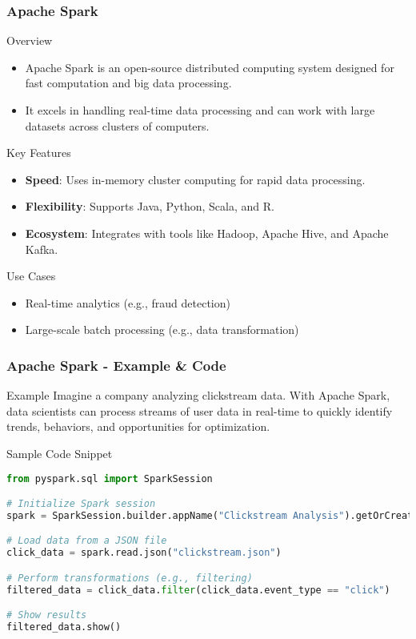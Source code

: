 \documentclass[aspectratio=169]{beamer}
\begin{document}
\begin{frame}
  \frametitle{Apache Spark}
  \begin{block}{Overview}
  \begin{itemize}
    \item Apache Spark is an open-source distributed computing system designed for fast computation and big data processing.
    \item It excels in handling real-time data processing and can work with large datasets across clusters of computers.
  \end{itemize}
  \end{block}

  \begin{block}{Key Features}
  \begin{itemize}
    \item \textbf{Speed}: Uses in-memory cluster computing for rapid data processing.
    \item \textbf{Flexibility}: Supports Java, Python, Scala, and R.
    \item \textbf{Ecosystem}: Integrates with tools like Hadoop, Apache Hive, and Apache Kafka.
  \end{itemize}
  \end{block}

  \begin{block}{Use Cases}
  \begin{itemize}
    \item Real-time analytics (e.g., fraud detection)
    \item Large-scale batch processing (e.g., data transformation)
  \end{itemize}
  \end{block}
\end{frame}

\begin{frame}[fragile]
  \frametitle{Apache Spark - Example & Code}
  \begin{block}{Example}
  Imagine a company analyzing clickstream data. With Apache Spark, data scientists can process streams of user data in real-time to quickly identify trends, behaviors, and opportunities for optimization.
  \end{block}

  \begin{block}{Sample Code Snippet}
  \begin{lstlisting}[language=Python]
from pyspark.sql import SparkSession

# Initialize Spark session
spark = SparkSession.builder.appName("Clickstream Analysis").getOrCreate()

# Load data from a JSON file
click_data = spark.read.json("clickstream.json")

# Perform transformations (e.g., filtering)
filtered_data = click_data.filter(click_data.event_type == "click")

# Show results
filtered_data.show()
  \end{lstlisting}
  \end{block}
\end{frame}
\end{document}
